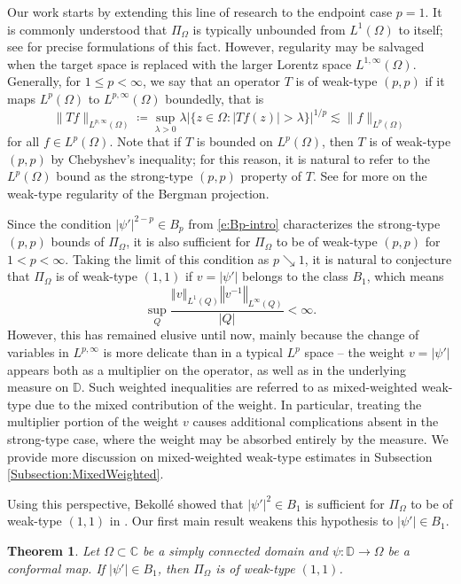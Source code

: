 \documentclass{amsart}
\newcommand{\norm}[1]{\left\Vert {#1}\right\Vert}
\newtheorem{theorem}{Theorem}[section]
\theoremstyle{definition}
\numberwithin{equation}{section}
\begin{document}
Our work starts by extending this line of research to the endpoint case $p=1$.
It is commonly understood that $\Pi_\Omega$  
is typically unbounded from $L^1(\Omega)$ to itself; see \cite{Dall22} for precise formulations of this fact. However, regularity may be salvaged when the target space is replaced with the larger Lorentz space $L^{1,\infty}(\Omega)$. 
Generally, for $1 \le p < \infty$, we say that an operator $T$ is of weak-type $(p,p)$ if it maps $L^p(\Omega)$ to $L^{p,\infty}(\Omega)$ boundedly, that is 
$$
    \|Tf\|_{L^{p,\infty}(\Omega)} \coloneq \sup_{\lambda>0}\lambda |\{z \in \Omega\colon |Tf(z)|>\lambda\}|^{1/p} \lesssim \|f\|_{L^p(\Omega)}
$$
for all $f \in L^p(\Omega)$. Note that if $T$ is bounded on $L^p(\Omega)$, then $T$ is of weak-type $(p,p)$ by Chebyshev's inequality; for this reason, it is natural to refer to the $L^p(\Omega)$ bound as the strong-type $(p,p)$ property of $T$. See \cites{Bek82, Bek86, DHZ2001, McN94, SW23, CNSW25} for more on the weak-type regularity of the Bergman projection. 

Since the condition $|\psi'|^{2-p} \in B_p$ from \eqref{e:Bp-intro} characterizes the strong-type $(p,p)$ bounds of $\Pi_\Omega$, it is also sufficient for $\Pi_\Omega$ to be of weak-type $(p,p)$ for $1<p<\infty$. Taking the limit of this condition 
as $p \searrow 1$, 
it is natural to conjecture that $\Pi_\Omega$ is of weak-type $(1,1)$ if $v=|\psi'|$ belongs to the class $B_1$, which means 
    \begin{equation*}\label{e:B1} 
    \sup_Q\frac{\norm{v}_{L^1(Q)} \norm{v^{-1}}_{L^\infty(Q)}}{|Q|} < \infty.\end{equation*}
However, this has remained elusive until now, mainly because the change of variables in $L^{p,\infty}$ is more delicate than in a typical $L^p$ space -- the weight $v=|\psi'|$ appears both as a multiplier on the operator, as well as in the underlying measure on $\mathbb D$. Such weighted inequalities are referred to as mixed-weighted weak-type due to the mixed contribution of the weight. 
In particular, treating the multiplier portion of the weight $v$ causes additional complications absent in the strong-type case, where the weight may be absorbed entirely by the measure. We provide more discussion on mixed-weighted weak-type estimates in Subsection \ref{Subsection:MixedWeighted}. 

Using this perspective, Bekoll\'e showed that $|\psi'|^2 \in B_1$ is sufficient for $\Pi_{\Omega}$ to be of weak-type $(1,1)$ in \cite{Bek86}. Our first main result weakens this hypothesis to $|\psi'| \in B_1$. 
\begin{theorem}\label{thm:B1}
Let $\Omega \subset \mathbb C$ be a simply connected domain
and $\psi\colon \mathbb D \to \Omega$ be a conformal map. If $|\psi'| \in B_1$, then $\Pi_\Omega$ is of weak-type $(1,1)$. 
\end{theorem}
\end{document}
